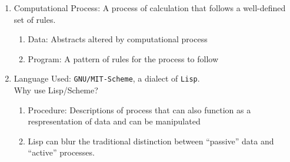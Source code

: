
\begin{enumerate}
\item Computational Process: A process of calculation that
    follows a well-defined set of rules.
    \begin{enumerate}
    \item Data: Abstracts altered by computational process
    \item Program: A pattern of rules for the process to follow
    \end{enumerate}
\item Language Used: \texttt{GNU/MIT-Scheme}, a dialect of
    \texttt{Lisp}.\\Why use Lisp/Scheme?
    \begin{enumerate}
    \item Procedure: Descriptions of process that can also function
        as a respresentation of data and can be manipulated
    \item Lisp can blur the traditional distinction between
        ``passive'' data and ``active'' processes.
    \end{enumerate}
\end{enumerate}
